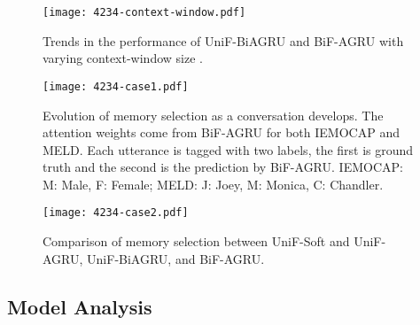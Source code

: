 \documentclass[letterpaper]{article} \usepackage{aaai20}  \usepackage{times}  \usepackage{helvet} \usepackage{courier}  \usepackage[hyphens]{url}  \usepackage{graphicx} \urlstyle{rm} \def\UrlFont{\rm}  \usepackage{graphicx}  \frenchspacing  \setlength{\pdfpagewidth}{8.5in}  \setlength{\pdfpageheight}{11in}
\begin{document}
\begin{table}[t!]
\fontsize{10}{11}\selectfont
\centering
\begin{threeparttable}
\end{threeparttable}
\caption{\label{table:result_AttCompare}Testing results on IEMOCAP and MELD, with different choices of attention and memory bank.}
\end{table}


\begin{figure}[t]
    \centering
    \texttt{[image: 4234-context-window.pdf]}
    \caption{Trends in the performance of UniF-BiAGRU and BiF-AGRU with varying context-window size .}
    \label{fig:context_window}
\end{figure}


\begin{figure*}[t!]
    \centering
    \texttt{[image: 4234-case1.pdf]}
    \caption{Evolution of memory selection as a conversation develops. The attention weights come from BiF-AGRU for both IEMOCAP and MELD. Each utterance is tagged with two labels, the first is ground truth and the second is the prediction by BiF-AGRU. IEMOCAP: M: Male, F: Female; MELD: J: Joey, M: Monica, C: Chandler.}
    \label{fig:att_visual1}
\end{figure*}

\begin{figure}[t]
    \centering
    \texttt{[image: 4234-case2.pdf]}
    \caption{Comparison of memory selection between UniF-Soft and UniF-AGRU, UniF-BiAGRU, and BiF-AGRU.}
    \label{fig:att_visual2}
\end{figure}


\subsection{Model Analysis}
\label{ssec:model_analysis}
\end{document}
